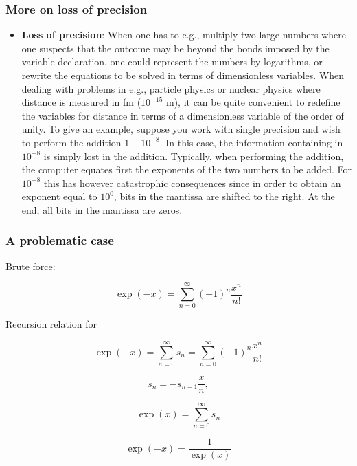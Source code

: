 \documentclass[handout]{beamer}
\newenvironment{block_mdfboxadmon}[1][]{\begin{block}{#1}}{\end{block}}
\begin{document}
\begin{frame}
\frametitle{More on loss of precision}

\begin{block_mdfboxadmon}

\begin{itemize}
  \item \textbf{Loss of precision}: When one has to e.g., multiply two large numbers where one suspects that the outcome may be beyond the bonds imposed by the variable declaration, one could represent the numbers by logarithms, or rewrite the equations to be solved in terms of dimensionless variables. When dealing with problems in e.g., particle physics or nuclear physics where distance is measured in fm ($10^{-15}$ m), it can be quite convenient to redefine the variables for distance in terms of a dimensionless variable of the order of unity. To give an example, suppose you work with single precision and wish to perform the addition $1+10^{-8}$. In this case, the information containing in $10^{-8}$ is simply lost in the addition. Typically, when performing the addition, the computer equates first the exponents of the two numbers to be added. For $10^{-8}$ this has however catastrophic consequences since in order to obtain an exponent equal to $10^0$, bits in the mantissa are shifted to the right. At the end, all bits in the mantissa are zeros.
\end{itemize}

\noindent
\end{block_mdfboxadmon}
\end{frame}

\begin{frame}
\frametitle{A problematic case}

\begin{block_mdfboxadmon}
Brute force:

\[\exp{(-x)}=\sum_{n=0}^{\infty}(-1)^n\frac{x^n}{n!}\]

Recursion relation for

\[ \exp{(-x)}=\sum_{n=0}^{\infty}s_n=\sum_{n=0}^{\infty}(-1)^n\frac{x^n}{n!} \]

\[ s_n=-s_{n-1}\frac{x}{n}, \]

\[ \exp{(x)}=\sum_{n=0}^{\infty}s_n \]

\[ \exp{(-x)}=\frac{1}{\exp{(x)}} \]
\end{block_mdfboxadmon}
\end{frame}
\end{document}
